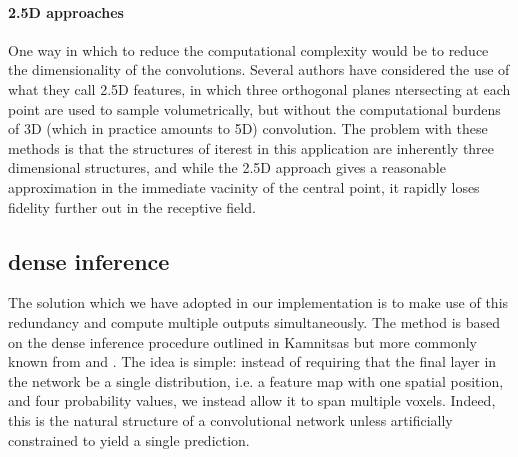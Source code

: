 \documentclass[msc]{infthesis}
\begin{document}
\paragraph*{2.5D  approaches}
%
One way in which to reduce the computational complexity would be to reduce the dimensionality of
the convolutions.  Several authors have considered the use of what they call 2.5D features, in which
three orthogonal planes ntersecting at each point are used to sample volumetrically, but without
the computational burdens of 3D (which in practice amounts to 5D) convolution.  The problem with
these methods is that the structures of iterest in this application are inherently three dimensional
structures, and while the 2.5D approach gives a reasonable approximation in the immediate vacinity
of the central point, it rapidly loses fidelity further out in the receptive field. 




\subsection{dense inference}
\label{sec:segmentation:dense-inference}

The solution which we have adopted in our implementation is to make use of this redundancy and
compute multiple outputs simultaneously.  The method is based on the dense inference procedure
outlined in Kamnitsas \cite{Kamnitsas:multi-scale-3D-CNN-with-CRF} but more commonly known from
\cite{ronneberger2015u} and \cite{milletari2016v}.  The idea is simple: instead of requiring
that the final layer in the network be a single distribution, i.e. a feature map with one
spatial position, and four probability values, we instead allow it to span multiple voxels.
Indeed, this is the natural structure of a convolutional network unless artificially constrained
to yield a single prediction.


\end{document}
